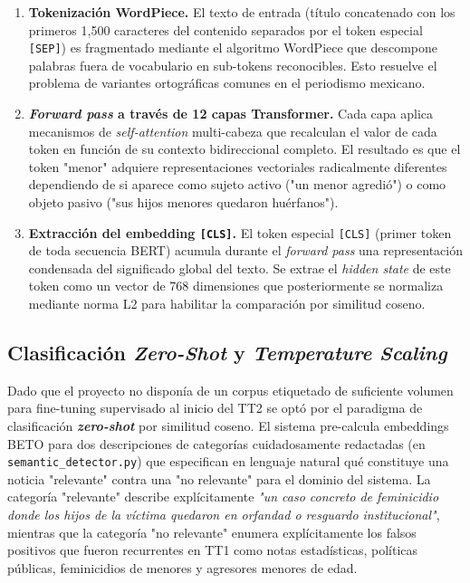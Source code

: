 \begin{enumerate}
    \item \textbf{Tokenización WordPiece.} El texto de entrada (título concatenado
          con los primeros 1{,}500 caracteres del contenido separados por el token
          especial \texttt{[SEP]}) es fragmentado mediante el algoritmo WordPiece
          que descompone palabras fuera de vocabulario en sub-tokens reconocibles.
          Esto resuelve el problema de variantes ortográficas comunes en el periodismo
          mexicano.

    \item \textbf{\textit{Forward pass} a través de 12 capas Transformer.} Cada
          capa aplica mecanismos de \textit{self-attention} multi-cabeza que
          recalculan el valor de cada token en función de su contexto bidireccional
          completo. El resultado es que el token "menor" adquiere representaciones
          vectoriales radicalmente diferentes dependiendo de si aparece como sujeto
          activo ("un menor agredió") o como objeto pasivo ("sus hijos menores
          quedaron huérfanos").

    \item \textbf{Extracción del embedding \texttt{[CLS]}.} El token especial
          \texttt{[CLS]} (primer token de toda secuencia BERT) acumula durante el
          \textit{forward pass} una representación condensada del significado global
          del texto. Se extrae el \textit{hidden state} de este token como un vector
          de 768 dimensiones que posteriormente se normaliza mediante norma L2
          para habilitar la comparación por similitud coseno.
\end{enumerate}


\subsection{Clasificación \textit{Zero-Shot} y \textit{Temperature Scaling}}
\label{subsec:tt2_zeroshot}

Dado que el proyecto no disponía de un corpus etiquetado de suficiente volumen para
fine-tuning supervisado al inicio del TT2 se optó por el paradigma de clasificación
\textbf{\textit{zero-shot}} por similitud coseno. El sistema pre-calcula embeddings
BETO para dos descripciones de categorías cuidadosamente redactadas
(en \texttt{semantic\_detector.py}) que especifican en lenguaje natural qué constituye
una noticia "relevante" contra una "no relevante" para el dominio del sistema. La categoría
"relevante" describe explícitamente \textit{"un caso concreto de feminicidio donde los hijos
de la víctima quedaron en orfandad o resguardo institucional"}, mientras que la categoría "no relevante"
enumera explícitamente los falsos positivos que fueron recurrentes en TT1 como notas estadísticas,
políticas públicas, feminicidios de menores y agresores menores de edad.


